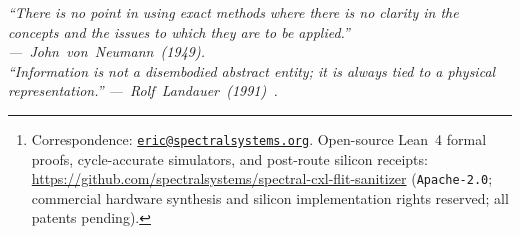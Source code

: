 \documentclass[10pt,twocolumn]{article}
\title{\vspace{-2.0em}{\fontsize{14.5}{17.4}\selectfont\bfseries\hyphenpenalty=10000\exhyphenpenalty=10000
Stateless Sub-Flit Capability Sanitization, Algebraic Cohort Ratcheting,\\
and Post-Route Formal Verification for Disaggregated CXL~3.0--4.0\\
and UCIe Memory Fabrics\par}\vspace{-0.35em}}
\author{
  \textbf{Eric C. Murphy}\thanks{Correspondence: \href{mailto:eric@spectralsystems.org}{\texttt{eric@spectralsystems.org}}. Open-source Lean~4 formal proofs, cycle-accurate simulators, and post-route silicon receipts: \url{https://github.com/spectralsystems/spectral-cxl-flit-sanitizer} (\texttt{Apache-2.0}; commercial hardware synthesis and silicon implementation rights reserved; all patents pending).}\\
  {\small Spectral Systems LLC}\\
  {\footnotesize\href{mailto:eric@spectralsystems.org}{\texttt{eric@spectralsystems.org}} \;|\; \url{https://github.com/spectralsystems/spectral-cxl-flit-sanitizer}}
}
\date{\vspace{-0.3em}November 2026\vspace{-0.3em}}
\theoremstyle{spectralthm}
\begin{document}
\onecolumn
\maketitle
\thispagestyle{plain}

\vspace{-0.55em}
\begin{center}
\begin{minipage}{0.90\textwidth}
\centering\footnotesize\itshape
``There is no point in using exact methods where there is no clarity in the concepts and the issues to which they are to be applied.'' ---~\upshape John~von~Neumann~(1949).\vspace{0.12em}\\
\itshape
``Information is not a disembodied abstract entity; it is always tied to a physical representation.'' ---~\upshape Rolf~Landauer~(1991)~\cite{landauer1961irreversibility}.
\end{minipage}
\end{center}
\vspace{-0.20em}
\end{document}
